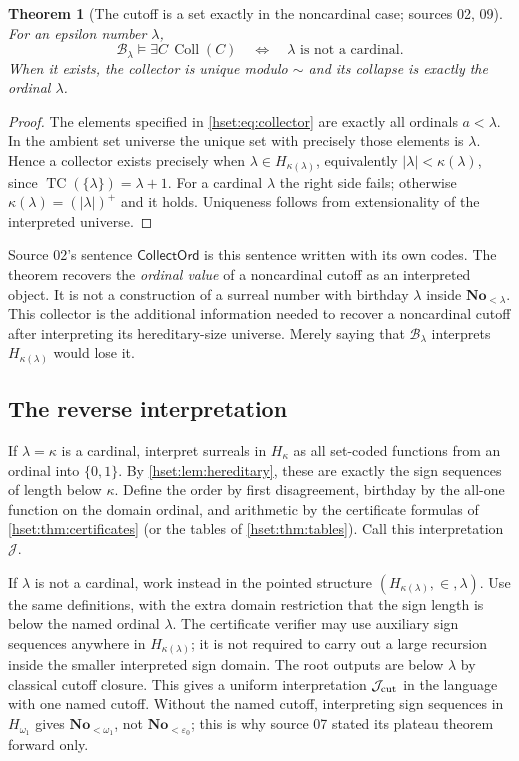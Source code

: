 \documentclass[11pt,letterpaper]{article}
\newtheorem{theorem}{Theorem}[section]
\theoremstyle{definition}
\theoremstyle{remark}
\newcommand{\No}{\mathbf{No}}
\newcommand{\TC}{\operatorname{TC}}
\newcommand{\B}{\mathcal B}
\newcommand{\J}{\mathcal J}
\newcommand{\Coll}{\operatorname{Coll}}
\newcommand{\card}[1]{\lvert#1\rvert}
\begin{document}
\begin{theorem}[The cutoff is a set exactly in the noncardinal case; sources 02, 09]
\label{hset:thm:collector}
For an epsilon number $\lambda$,
\[
 \B_\lambda\models\exists C\,\Coll(C)
 \quad\Longleftrightarrow\quad
 \lambda\text{ is not a cardinal}.
\]
When it exists, the collector is unique modulo $\sim$ and its collapse is
exactly the ordinal $\lambda$.
\end{theorem}
\begin{proof}
The elements specified in \eqref{hset:eq:collector} are exactly all ordinals
$a<\lambda$. In the ambient set universe the unique set with precisely
those elements is $\lambda$. Hence a collector exists precisely when
$\lambda\in H_{\kappa(\lambda)}$, equivalently
$\card\lambda<\kappa(\lambda)$, since $\TC(\{\lambda\})=\lambda+1$. For a
cardinal $\lambda$ the right side fails; otherwise
$\kappa(\lambda)=(\card\lambda)^+$ and it holds. Uniqueness follows from
extensionality of the interpreted universe.
\end{proof}

Source 02's sentence $\mathsf{CollectOrd}$ is this sentence written with its
own codes. The theorem recovers the \emph{ordinal value} of a noncardinal
cutoff as an interpreted object. It is not a construction of a surreal number
with birthday $\lambda$ inside $\No_{<\lambda}$. This collector is the
additional information needed to recover a noncardinal cutoff after
interpreting its hereditary-size universe. Merely saying that $\B_\lambda$
interprets $H_{\kappa(\lambda)}$ would lose it.

\subsection{The reverse interpretation}

If $\lambda=\kappa$ is a cardinal, interpret surreals in $H_\kappa$ as all
set-coded functions from an ordinal into $\{0,1\}$. By
\cref{hset:lem:hereditary}, these are exactly the sign sequences of length
below $\kappa$. Define the order by first disagreement, birthday by the
all-one function on the domain ordinal, and arithmetic by the certificate
formulas of \cref{hset:thm:certificates} (or the tables of
\cref{hset:thm:tables}). Call this interpretation $\J$.

If $\lambda$ is not a cardinal, work instead in the pointed structure
$(H_{\kappa(\lambda)},\in,\lambda)$. Use the same definitions, with the
extra domain restriction that the sign length is below the named ordinal
$\lambda$. The certificate verifier may use auxiliary sign sequences
anywhere in $H_{\kappa(\lambda)}$; it is not required to carry out a large
recursion inside the smaller interpreted sign domain. The root outputs are
below $\lambda$ by classical cutoff closure. This gives a uniform
interpretation $\J_{\rm cut}$ in the language with one named cutoff.
Without the named cutoff, interpreting sign sequences in $H_{\omega_1}$ gives
$\No_{<\omega_1}$, not $\No_{<\varepsilon_0}$; this is why source 07 stated its
plateau theorem forward only.
\end{document}

